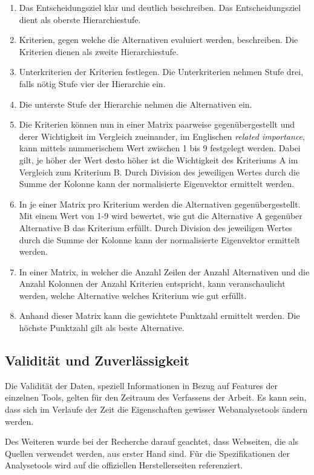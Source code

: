 \begin{enumerate}
  \item Das Entscheidungsziel klar und deutlich beschreiben. Das Entscheidungsziel dient als oberste Hierarchiestufe.
  \item Kriterien, gegen welche die Alternativen evaluiert werden, beschreiben. Die Kriterien dienen als zweite Hierarchiestufe.
  \item Unterkriterien der Kriterien festlegen. Die Unterkriterien nehmen Stufe drei, falls nötig Stufe vier der Hierarchie ein.
  \item Die unterste Stufe der Hierarchie nehmen die Alternativen ein.
  \item Die Kriterien können nun in einer Matrix paarweise gegenübergestellt und derer Wichtigkeit im Vergleich zueinander, im Englischen \textit{related importance}, kann mittels nummerischem Wert zwischen 1 bis 9 festgelegt werden. Dabei gilt, je höher der Wert desto höher ist die Wichtigkeit des Kriteriums A im Vergleich zum Kriterium B. Durch Division des jeweiligen Wertes durch die Summe der Kolonne kann der normalisierte Eigenvektor ermittelt werden.
  \item In je einer Matrix pro Kriterium werden die Alternativen gegenübergestellt. Mit einem Wert von 1-9 wird bewertet, wie gut die Alternative A gegenüber Alternative B das Kriterium erfüllt. Durch Division des jeweiligen Wertes durch die Summe der Kolonne kann der normalisierte Eigenvektor ermittelt werden.
  \item In einer Matrix, in welcher die Anzahl Zeilen der Anzahl Alternativen und die Anzahl Kolonnen der Anzahl Kriterien entspricht, kann veranschaulicht werden, welche Alternative welches Kriterium wie gut erfüllt.
  \item Anhand dieser Matrix kann die gewichtete Punktzahl ermittelt werden. Die höchste Punktzahl gilt als beste Alternative.
\end{enumerate} 

\subsection{Validität und Zuverlässigkeit}
Die Validität der Daten, speziell Informationen in Bezug auf Features der einzelnen Tools, gelten für den Zeitraum des Verfassens der Arbeit. Es kann sein, dass sich im Verlaufe der Zeit die Eigenschaften gewisser Webanalysetools ändern werden. 

Des Weiteren wurde bei der Recherche darauf geachtet, dass Webseiten, die als Quellen verwendet werden, aus erster Hand sind. Für die Spezifikationen der Analysetools wird auf die offiziellen Herstellerseiten referenziert.

